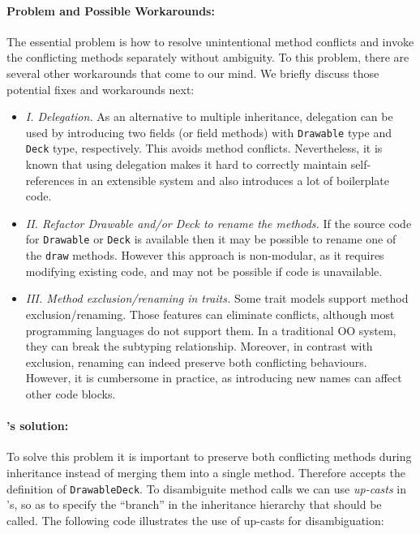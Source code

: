 \paragraph{Problem and Possible Workarounds:} The essential problem is
how to resolve unintentional method conflicts and invoke the
conflicting methods separately without ambiguity. To this problem, there are several other workarounds
that come to our mind. We briefly discuss those potential fixes and
workarounds next:
\begin{itemize}
  \item \textit{I. Delegation.} As an alternative to multiple inheritance,
  delegation can be used by introducing two fields (or field methods) with
  \lstinline|Drawable| type and \lstinline|Deck| type,
  respectively. This avoids method conflicts. Nevertheless, it is known
  that using delegation makes it hard to correctly maintain
  self-references in an extensible system and also
  introduces a lot of boilerplate code.
  \item \textit{II. Refactor Drawable and/or Deck to rename the methods.} If
  the source code for \lstinline|Drawable| or \lstinline|Deck| is available
  then it may be possible to rename one of the \lstinline|draw|
  methods. However this approach is non-modular, as it requires 
  modifying existing code, and may not be possible if code is unavailable.
  \item \textit{III. Method exclusion/renaming in traits.} Some trait models
  support method exclusion/renaming. Those features
   can eliminate conflicts, although most
  programming languages do not support them. In a traditional OO system,
  they can break the subtyping relationship. Moreover, in
  contrast with exclusion, renaming can indeed preserve both conflicting
  behaviours. However, it is cumbersome in practice, as introducing new
  names can affect other code blocks.
\end{itemize}


\paragraph{\MIM{}'s solution:} To solve this problem it is important to preserve both conflicting methods
during inheritance instead of merging them into a single
method. Therefore \MIM{} accepts the definition of \lstinline|DrawableDeck|. To disambiguite method calls
we can use \emph{up-casts} in \MIM{}'s, so as to specify the ``branch'' in the
inheritance hierarchy that should be called. The following code
illustrates the use of up-casts for disambiguation:

